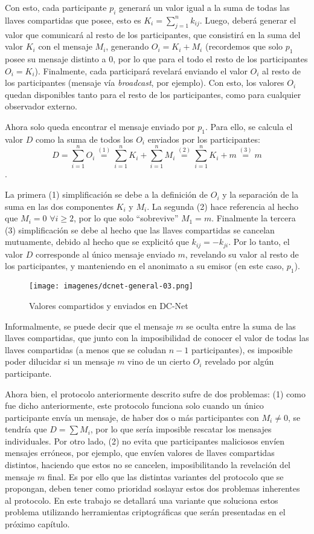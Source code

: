 Con esto, cada participante $p_i$ generará un valor igual a la suma de todas las llaves compartidas que posee, esto es $K_i = \sum_{j=1}^n k_{ij}$. 
Luego, deberá generar el valor que comunicará al resto de los participantes, que consistirá en la suma del valor $K_i$ con el mensaje $M_i$, 
generando $O_i = K_i + M_i$ (recordemos que solo $p_1$ posee su mensaje distinto a 0, por lo que para el todo el resto de los participantes $O_i = K_i$). 
Finalmente, cada participará revelará enviando el valor $O_i$ al resto de los participantes (mensaje vía \emph{broadcast}, por ejemplo). Con esto, los 
valores $O_i$ quedan disponibles tanto para el resto de los participantes, como para cualquier observador externo.

Ahora solo queda encontrar el mensaje enviado por $p_1$. Para ello, se calcula el valor $D$ como la suma de todos los $O_i$ enviados por los 
participantes: $$D = \sum_{i=1}^n O_i \overset{(1)}{=} \sum_{i=1}^n K_i + \sum_{i=1}^n M_i \overset{(2)}{=} \sum_{i=1}^n K_i + m \overset{(3)}{=} m$$.

La primera (1) simplificación se debe a la definición de $O_i$ y la separación de la suma en las dos componentes $K_i$ y $M_i$. La segunda 
(2) hace referencia al hecho que $M_i = 0$ $\forall i \geq 2$, por lo que solo ``sobrevive'' $M_1 = m$. Finalmente la tercera (3) simplificación 
se debe al hecho que las llaves compartidas se cancelan mutuamente, debido al hecho que se explicitó que $k_{ij} = -k_{ji}$. Por lo tanto, el 
valor $D$ corresponde al único mensaje enviado $m$, revelando su valor al resto de los participantes, y manteniendo en el anonimato a su emisor 
(en este caso, $p_1$).

\begin{figure}
  \centering
    \texttt{[image: imagenes/dcnet-general-03.png]}
  \caption{Valores compartidos y enviados en DC-Net}
\end{figure}

Informalmente, se puede decir que el mensaje $m$ se oculta entre la suma de las llaves compartidas, que junto con la imposibilidad de conocer el 
valor de todas las llaves compartidas (a menos que se coludan $n-1$ participantes), es imposible poder dilucidar si un mensaje $m$ vino de un 
cierto $O_i$ revelado por algún participante.

Ahora bien, el protocolo anteriormente descrito sufre de dos problemas: (1) como fue dicho anteriormente, este protocolo funciona solo cuando un 
único participante envía un mensaje, de haber dos o más participantes con $M_i \neq 0$, se tendría que $D = \sum M_i$, por lo que sería imposible 
rescatar los mensajes individuales. Por otro lado, (2) no evita que participantes maliciosos envíen mensajes erróneos, por ejemplo, que envíen 
valores de llaves compartidas distintos, haciendo que estos no se cancelen, imposibilitando la revelación del mensaje $m$ final. Es por ello que 
las distintas variantes del protocolo que se propongan, deben tener como prioridad soslayar estos dos problemas inherentes al protocolo. En este 
trabajo se detallará una variante que soluciona estos problema utilizando herramientas criptográficas que serán presentadas en el próximo capítulo.


